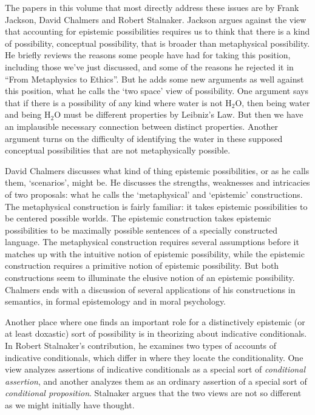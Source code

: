 The papers in this volume that most directly address these issues are by Frank Jackson, David Chalmers and Robert Stalnaker. Jackson argues against the view that accounting for epistemic possibilities requires us to think that there is a kind of possibility, conceptual possibility, that is broader than metaphysical possibility. He briefly reviews the reasons some people have had for taking this position, including those we've just discussed, and some of the reasons he rejected it in ``From Metaphysics to Ethics''. But he adds some new arguments as well against this position, what he calls the `two space' view of possibility. One argument says that if there is a possibility of any kind where water is not H$_2$O, then being water and being H$_2$O must be different properties by Leibniz's Law. But then we have an implausible necessary connection between distinct properties. Another argument turns on the difficulty of identifying the water in these supposed conceptual possibilities that are not metaphysically possible.

David Chalmers discusses what kind of thing epistemic possibilities, or as he calls them, `scenarios', might be. He discusses the strengths, weaknesses and intricacies of two proposals: what he calls the `metaphysical' and `epistemic' constructions. The metaphysical construction is fairly familiar: it takes epistemic possibilities to be centered possible worlds. The epistemic construction takes epistemic possibilities to be maximally possible sentences of a specially constructed language. The metaphysical construction requires several assumptions before it matches up with the intuitive notion of epistemic possibility, while the epistemic construction requires a primitive notion of epistemic possibility. But both constructions seem to illuminate the elusive notion of an epistemic possibility. Chalmers ends with a discussion of several applications of his constructions in semantics, in formal epistemology and in moral psychology.

Another place where one finds an important role for a distinctively epistemic (or at least doxastic) sort of possibility is in theorizing about indicative conditionals.  In Robert Stalnaker's contribution, he examines two types of accounts of indicative conditionals, which differ in where they locate the conditionality.  One view analyzes assertions of indicative conditionals as a special sort of \textit{conditional assertion}, and another analyzes them as an ordinary assertion of a special sort of \textit{conditional proposition}.  Stalnaker argues that the two views are not so different as we might initially have thought.

